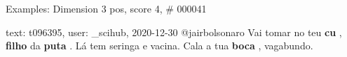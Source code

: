 \begin{frame}{Examples: Dimension 3 pos, score 4, \# 000041}
\footnotesize
\begin{exampleblock}{text: t096395, user: \_scihub, 2020-12-30}
@jairbolsonaro Vai tomar no teu \textbf{cu} , \textbf{filho} da \textbf{puta} . 
Lá tem seringa e vacina. Cala a tua \textbf{boca} , vagabundo. 
\end{exampleblock}
\end{frame}
